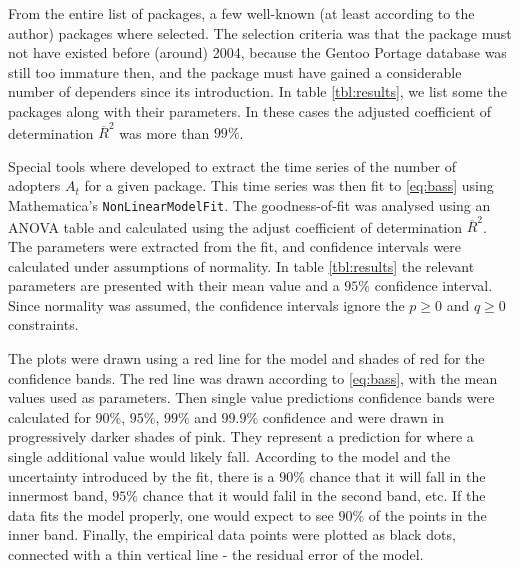 \documentclass[smallextended,final]{svjour3}
\begin{document}

From the entire list of packages, a few well-known (at least according to the author) packages where selected. The selection criteria was that the package must not have existed before (around) 2004, because the Gentoo Portage database was still too immature then, and the package must have gained a considerable number of dependers since its introduction. In table \ref{tbl:results}, we list some the packages along with their parameters. In these cases the adjusted coefficient of determination $\overline{R}^2$ was more than $99\%$.

Special tools where developed to extract the time series of the number of adopters $A_t$ for a given package. This time series was then fit to \eqref{eq:bass} using Mathematica's \texttt{NonLinearModelFit}. The goodness-of-fit was analysed using an ANOVA table and calculated using the adjust coefficient of determination $\overline{R}^2$. The parameters were extracted from the fit, and confidence intervals were calculated under assumptions of normality. In table \ref{tbl:results} the relevant parameters are presented with their mean value and a $95\%$ confidence interval. Since normality was assumed, the confidence intervals ignore the $p \ge 0$ and $q \ge 0$ constraints. 

The plots were drawn using a red line for the model and shades of red for the confidence bands. The red line was drawn according to \eqref{eq:bass}, with the mean values used as parameters. Then single value predictions confidence bands were calculated for $90\%$, $95\%$, $99\%$ and $99.9\%$ confidence and were drawn in progressively darker shades of pink. They represent a prediction for where a single additional value would likely fall. According to the model and the uncertainty introduced by the fit, there is a $90\%$ chance that it will fall in the innermost band, $95\%$ chance that it would falil in the second band, etc. If the data fits the model properly, one would expect to see $90\%$ of the points in the inner band. Finally, the empirical data points were plotted as black dots, connected with a thin vertical line - the residual error of the model.
\end{document}
